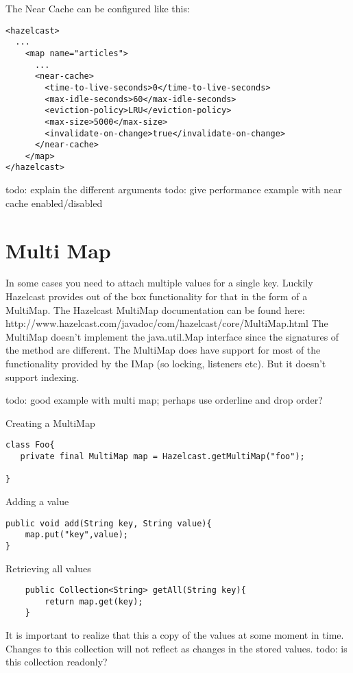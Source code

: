 The Near Cache can be configured like this:
\begin{verbatim}
<hazelcast>
  ...
    <map name="articles">
      ...
      <near-cache>
        <time-to-live-seconds>0</time-to-live-seconds>
        <max-idle-seconds>60</max-idle-seconds>
        <eviction-policy>LRU</eviction-policy>
        <max-size>5000</max-size>
        <invalidate-on-change>true</invalidate-on-change>
      </near-cache>
    </map>
</hazelcast>
\end{verbatim}

todo: explain the different arguments
todo: give performance example with near cache enabled/disabled

\section{Multi Map}

In some cases you need to attach multiple values for a single key. Luckily Hazelcast provides out of the box functionality for that in the form of a MultiMap. The Hazelcast MultiMap documentation can be found here: http://www.hazelcast.com/javadoc/com/hazelcast/core/MultiMap.html
The MultiMap doesn't implement the java.util.Map interface since the signatures of the method are different. The MultiMap does have support for most of the functionality provided by the IMap (so locking, listeners etc). But it doesn't support indexing.

todo: good example with multi map; perhaps use orderline and drop order?

Creating a MultiMap

\begin{verbatim}
class Foo{
   private final MultiMap map = Hazelcast.getMultiMap("foo");
	
}
\end{verbatim}

Adding a value

\begin{verbatim}
public void add(String key, String value){
	map.put("key",value);
}
\end{verbatim}

Retrieving all values

\begin{verbatim}
	public Collection<String> getAll(String key){
		return map.get(key);
	}
\end{verbatim}

It is important to realize that this a copy of the values at some moment in time. Changes to this collection will not reflect as changes in the stored values. todo: is this collection readonly?

